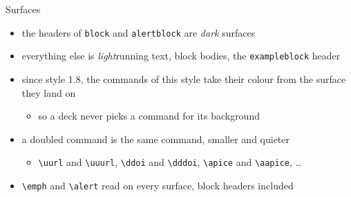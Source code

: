 \begin{frame}[c]{Surfaces}
%
\begin{itemize}
	\item the headers of \texttt{block} and \texttt{alertblock} are \emph{dark} surfaces
	\item everything else is \emph{light}\textemdash{}running text, block bodies, the \texttt{exampleblock} header
	\item since style 1.8, the commands of this style take their colour from the surface they land on
	\begin{itemize}
		\item so a deck never picks a command for its background
	\end{itemize}
	\item a doubled command is the same command, \alert{smaller and quieter}
	\begin{itemize}
		\item \texttt{\textbackslash{}uurl} and \texttt{\textbackslash{}uuurl}, \texttt{\textbackslash{}ddoi} and \texttt{\textbackslash{}dddoi}, \texttt{\textbackslash{}apice} and \texttt{\textbackslash{}aapice}, \ldots
	\end{itemize}
	\item \texttt{\textbackslash{}emph} and \texttt{\textbackslash{}alert} read on every surface, block headers included
\end{itemize}
%
\end{frame}
